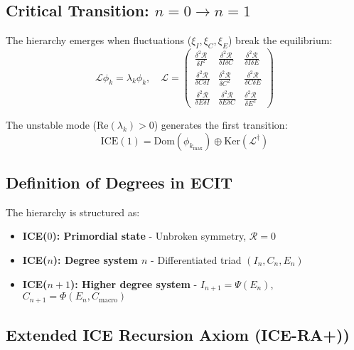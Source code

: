 \documentclass{article}
\begin{document}
\subsection{Critical Transition: \texorpdfstring{$n=0 \to n=1$}{n=0 -> n=1}}
The hierarchy emerges when fluctuations ($\xi_I, \xi_C, \xi_E$) break the equilibrium:
\begin{equation}
\mathcal{L}\phi_k = \lambda_k\phi_k,\quad \mathcal{L} = \begin{pmatrix}
\frac{\delta^2\mathcal{R}}{\delta I^2} & \frac{\delta^2\mathcal{R}}{\delta I\delta C} & \frac{\delta^2\mathcal{R}}{\delta I\delta E} \\
\frac{\delta^2\mathcal{R}}{\delta C\delta I} & \frac{\delta^2\mathcal{R}}{\delta C^2} & \frac{\delta^2\mathcal{R}}{\delta C\delta E} \\
\frac{\delta^2\mathcal{R}}{\delta E\delta I} & \frac{\delta^2\mathcal{R}}{\delta E\delta C} & \frac{\delta^2\mathcal{R}}{\delta E^2}
\end{pmatrix}
\end{equation}

The unstable mode ($\text{Re}(\lambda_k) > 0$) generates the first transition:
\begin{equation}
\text{ICE}(1) = \text{Dom}(\phi_{k_{\text{max}}}) \oplus \text{Ker}(\mathcal{L}^\dagger)
\end{equation}

\subsection{Definition of Degrees in ECIT}
\label{subsec:grados}

The hierarchy is structured as:
\begin{itemize}
\item \textbf{ICE($0$): Primordial state} - Unbroken symmetry, $\mathcal{R}=0$
\item \textbf{ICE($n$): Degree system $n$} - Differentiated triad $(I_n,C_n,E_n)$
\item \textbf{ICE($n+1$): Higher degree system} - $I_{n+1} = \Psi(E_n)$, $C_{n+1} = \Phi(E_n,C_{\text{macro}})$
\end{itemize}

\subsection{Extended ICE Recursion Axiom (ICE-RA+))}
\label{subsec:axioma_recursividad}

\noindent{}
\end{document}
